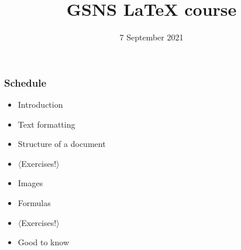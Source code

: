 

\title{GSNS \LaTeX{} course}
\author{\TeXniCie}
\date{7 September 2021}





\begin{frame}
	\titlepage
	\centering
\end{frame}

\begin{frame}
	\frametitle{Schedule}
	
	\begin{itemize}
		\item Introduction
		\item Text formatting
		\item Structure of a document
		\item $ \langle $Exercises!$ \rangle $
		\item Images
		\item Formulas
		\item $ \mathbf\langle $Exercises!$ \rangle $
		\item Good to know
	\end{itemize}
\end{frame}











% 



